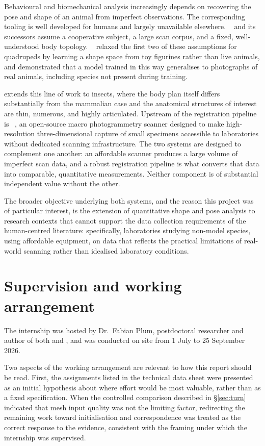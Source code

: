 Behavioural and biomechanical analysis increasingly depends on recovering
the pose and shape of an animal from imperfect observations. The corresponding
tooling is well developed for humans and largely unavailable elsewhere.
~\cite{smpl} and its successors assume a cooperative subject, a
large scan corpus, and a fixed, well-understood body topology. ~%
\cite{smal} relaxed the first two of these assumptions for quadrupeds by
learning a shape space from toy figurines rather than live animals, and
demonstrated that a model trained in this way generalises to photographs of
real animals, including species not present during training.

 extends this line of work to insects, where the body plan
itself differs substantially from the mammalian case and the anatomical
structures of interest are thin, numerous, and highly articulated. Upstream of
the registration pipeline is ~\cite{scant}, an open-source macro
photogrammetry scanner designed to make high-resolution three-dimensional
capture of small specimens accessible to laboratories without dedicated
scanning infrastructure. The two systems are designed to complement one
another: an affordable scanner produces a large volume of imperfect scan data,
and a robust registration pipeline is what converts that data into comparable,
quantitative measurements. Neither component is of substantial independent
value without the other.

The broader objective underlying both systems, and the reason this project was
of particular interest, is the extension of quantitative shape and pose
analysis to research contexts that cannot support the data collection
requirements of the human-centred literature: specifically, laboratories
studying non-model species, using affordable equipment, on data that reflects
the practical limitations of real-world scanning rather than idealised
laboratory conditions.

\section{Supervision and working arrangement}

The internship was hosted by Dr.\ Fabian Plum, postdoctoral researcher and
author of both  and , and was conducted on site from
1 July to 25 September 2026.

Two aspects of the working arrangement are relevant to how this report should
be read. First, the assignments listed in the technical data sheet were
presented as an initial hypothesis about where effort would be most valuable,
rather than as a fixed specification. When the controlled comparison described
in \S\ref{sec:turn} indicated that mesh input quality was not the limiting
factor, redirecting the remaining work toward initialisation and
correspondence was treated as the correct response to the evidence, consistent
with the framing under which the internship was supervised.

